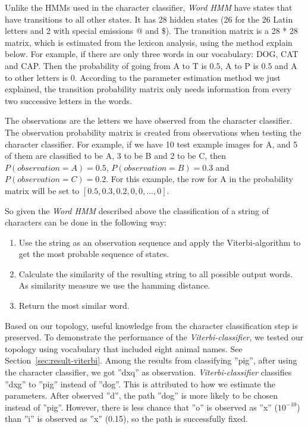 Unlike the HMMs used in the character classifier, \textit{Word HMM} have states that have transitions to all other states.
It has 28 hidden states (26 for the 26 Latin letters and 2 with special emissions @ and \$). 
The transition matrix is a 28 * 28 matrix, which is estimated from the lexicon analysis, using the method explain below.
For example, if there are only three words in our vocabulary: DOG, CAT and CAP.
Then the probability of going from A to T is $0.5$, A to P is $0.5$ and A to other letters is $0$.
According to the parameter estimation method we just explained, the transition probability matrix only needs information from every two successive letters in the words.

The observations are the letters we have observed from the character classifier.
The observation probability matrix is created from observations when testing the character classifier.
For example, if we have 10 test example images for A, and 5 of them are classified to be A, 3 to be B and 2 to be C, then $P(observation=A)=0.5$, $P(observation=B)=0.3$ and $P(observation=C)=0.2$.
For this example, the row for A in the probability matrix will be set to $[0.5, 0.3, 0.2, 0, 0,...,0]$.

So given the \textit{Word HMM} described above the classification of a string of characters can be done in the following way:

\begin{enumerate}
 \item Use the string as an observation sequence and apply the Viterbi-algorithm to get the most probable sequence of states.
 \item Calculate the similarity of the resulting string to all possible output words. As similarity measure we use the hamming distance. 
 \item Return the most similar word.
\end{enumerate}

Based on our topology, useful knowledge from the character classification step is preserved. 
To demonstrate the performance of the \emph{Viterbi-classifier}, we tested our topology using vocabulary that included eight animal names.
See Section~\ref{sec:result-viterbi}.
Among the results from classifying ''pig'', after using the character classifier, we got ''dxq'' as observation. \textit{Viterbi-classifier} classifies ''dxg'' to ''pig'' instead of ''dog''.
This is attributed to how we estimate the parameters. 
After observed ''d'', the path ''dog'' is more likely to be chosen instead of ''pig''. 
However, there is less chance that ''o'' is observed as ''x'' ($10^{-10}$) than ''i'' is observed as ''x'' (0.15), so the path is successfully fixed.


